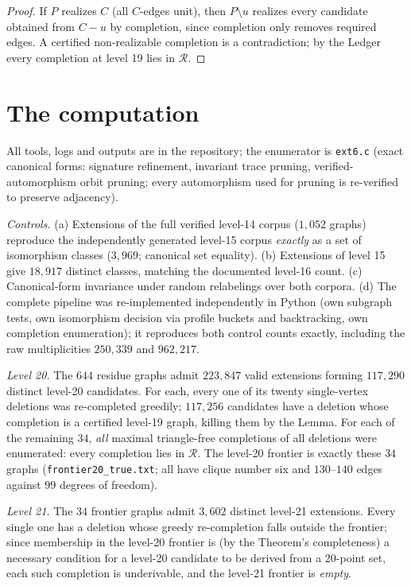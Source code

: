 \documentclass[11pt]{article}
\begin{document}
\begin{proof}
If $P$ realizes $C$ (all $C$-edges unit), then $P\setminus u$ realizes
every candidate obtained from $C-u$ by completion, since completion only
removes required edges. A certified non-realizable completion is a
contradiction; by the Ledger every completion at level 19 lies in
$\mathcal R$.
\end{proof}

\section*{The computation}

All tools, logs and outputs are in the repository; the enumerator is
\texttt{ext6.c} (exact canonical forms: signature refinement, invariant
trace pruning, verified-automorphism orbit pruning; every automorphism
used for pruning is re-verified to preserve adjacency).

\emph{Controls.} (a) Extensions of the full verified level-14 corpus
($1{,}052$ graphs) reproduce the independently generated level-15 corpus
\emph{exactly} as a set of isomorphism classes ($3{,}969$; canonical set
equality). (b) Extensions of level 15 give $18{,}917$ distinct classes,
matching the documented level-16 count. (c) Canonical-form invariance
under random relabelings over both corpora. (d) The complete pipeline was
re-implemented independently in Python (own subgraph tests, own
isomorphism decision via profile buckets and backtracking, own completion
enumeration); it reproduces both control counts exactly, including the
raw multiplicities $250{,}339$ and $962{,}217$.

\emph{Level 20.} The $644$ residue graphs admit $223{,}847$ valid
extensions forming $117{,}290$ distinct level-20 candidates. For each,
every one of its twenty single-vertex deletions was re-completed
greedily; $117{,}256$ candidates have a deletion whose completion is a
certified level-19 graph, killing them by the Lemma. For each of the
remaining $34$, \emph{all} maximal triangle-free completions of all
deletions were enumerated: every completion lies in $\mathcal R$. The
level-20 frontier is exactly these $34$ graphs
(\texttt{frontier20\_true.txt}; all have clique number six and $130$--$140$
edges against $99$ degrees of freedom).

\emph{Level 21.} The $34$ frontier graphs admit $3{,}602$ distinct
level-21 extensions. Every single one has a deletion whose greedy
re-completion falls outside the frontier; since membership in the
level-20 frontier is (by the Theorem's completeness) a necessary
condition for a level-20 candidate to be derived from a 20-point set,
each such completion is underivable, and the level-21 frontier is
\emph{empty}.
\end{document}
